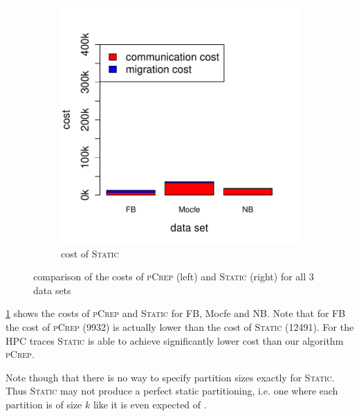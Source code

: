 \documentclass[a4paper,UKenglish,cleveref, autoref, thm-restate,authorcolumns]{lipics-v2019}
\newcommand{\adjDel}{\textsc{pCrep}}
\newcommand{\static}{\textsc{Static}}
\newcommand{\opt}{\text{O{\scriptsize PT}}}
\newcommand{\fb}{FB}
\newcommand{\dbmocfe}{Mocfe}
\newcommand{\dbnekbone}{NB}
\begin{document}
\begin{figure}[h]
\begin{minipage}{0.48\linewidth}
\begin{subfigure}[b]{\linewidth}
			\includegraphics*[width=\linewidth]{"plots/plot_cost_static"}
			\caption{cost of \static{}}
		\end{subfigure}		
	\end{minipage}
	\caption{comparison of the costs of \adjDel{} (left) and \static{} (right) for all 3 data sets}\label{fig:all_cost_barplot}
\end{figure}

\cref{fig:all_cost_barplot} shows the costs of \adjDel{} and \static{} for \fb{}, \dbmocfe{} and \dbnekbone{}.
Note that for \fb{} the cost of \adjDel{} (9932) is actually lower than the cost of \static{} (12491). For the HPC traces
\static{} is able to achieve significantly lower cost than our algorithm \adjDel{}.

Note though that there is no way to specify partition sizes exactly for \static{}. Thus \static{} may not produce a perfect 
static partitioning, i.e. one where each partition is of size $k$ like it is even expected of \opt{}.
\end{document}
